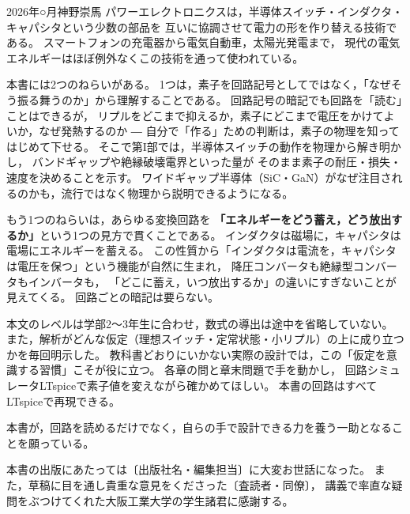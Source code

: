 \begin{preface}{2026年○月}{神野崇馬}
パワーエレクトロニクスは，半導体スイッチ・インダクタ・キャパシタという少数の部品を
互いに協調させて電力の形を作り替える技術である。
スマートフォンの充電器から電気自動車，太陽光発電まで，
現代の電気エネルギーはほぼ例外なくこの技術を通って使われている。

本書には2つのねらいがある。
1つは，素子を回路記号としてではなく，「なぜそう振る舞うのか」から理解することである。
回路記号の暗記でも回路を「読む」ことはできるが，
リプルをどこまで抑えるか，素子にどこまで電圧をかけてよいか，なぜ発熱するのか ―
自分で「作る」ための判断は，素子の物理を知ってはじめて下せる。
そこで第I部では，半導体スイッチの動作を物理から解き明かし，
バンドギャップや絶縁破壊電界といった量が
そのまま素子の耐圧・損失・速度を決めることを示す。
ワイドギャップ半導体（SiC・GaN）がなぜ注目されるのかも，流行ではなく物理から説明できるようになる。

もう1つのねらいは，あらゆる変換回路を
\textbf{「エネルギーをどう蓄え，どう放出するか」}という1つの見方で貫くことである。
インダクタは磁場に，キャパシタは電場にエネルギーを蓄える。
この性質から「インダクタは電流を，キャパシタは電圧を保つ」という機能が自然に生まれ，
降圧コンバータも絶縁型コンバータもインバータも，
「どこに蓄え，いつ放出するか」の違いにすぎないことが見えてくる。
回路ごとの暗記は要らない。

本文のレベルは学部2〜3年生に合わせ，数式の導出は途中を省略していない。
また，解析がどんな仮定（理想スイッチ・定常状態・小リプル）の上に成り立つかを毎回明示した。
教科書どおりにいかない実際の設計では，この「仮定を意識する習慣」こそが役に立つ。
各章の問と章末問題で手を動かし，
回路シミュレータLTspiceで素子値を変えながら確かめてほしい。
本書の回路はすべてLTspiceで再現できる。

本書が，回路を読めるだけでなく，自らの手で設計できる力を養う一助となることを願っている。

本書の出版にあたっては〔出版社名・編集担当〕に大変お世話になった。
また，草稿に目を通し貴重な意見をくださった〔査読者・同僚〕，
講義で率直な疑問をぶつけてくれた大阪工業大学の学生諸君に感謝する。
\end{preface}
